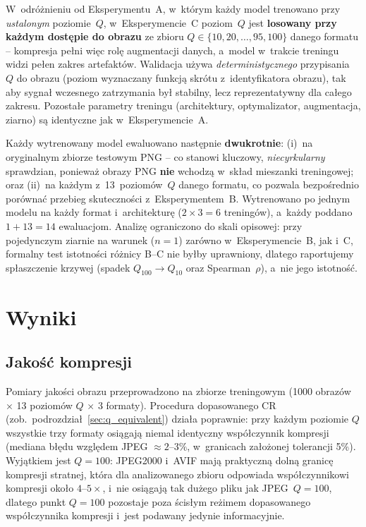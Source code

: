 \documentclass[12pt,a4paper]{article}
\begin{document}
W~odróżnieniu od Eksperymentu~A, w~którym każdy model trenowano przy \emph{ustalonym} poziomie~$Q$, w~Eksperymencie~C poziom~$Q$ jest \textbf{losowany przy każdym dostępie do obrazu} ze zbioru $Q \in \{10, 20, \dots, 95, 100\}$ danego formatu -- kompresja pełni więc rolę augmentacji danych, a~model w~trakcie treningu widzi pełen zakres artefaktów. Walidacja używa \emph{deterministycznego} przypisania~$Q$ do obrazu (poziom wyznaczany funkcją skrótu z~identyfikatora obrazu), tak aby sygnał wczesnego zatrzymania był stabilny, lecz reprezentatywny dla całego zakresu. Pozostałe parametry treningu (architektury, optymalizator, augmentacja, ziarno) są identyczne jak w~Eksperymencie~A.

Każdy wytrenowany model ewaluowano następnie \textbf{dwukrotnie}: (i)~na oryginalnym zbiorze testowym PNG -- co stanowi kluczowy, \emph{niecyrkularny} sprawdzian, ponieważ obrazy PNG \textbf{nie} wchodzą w~skład mieszanki treningowej; oraz (ii)~na każdym z~13~poziomów~$Q$ danego formatu, co pozwala bezpośrednio porównać przebieg skuteczności z~Eksperymentem~B. Wytrenowano po jednym modelu na każdy format i~architekturę ($2 \times 3 = 6$ treningów), a~każdy poddano $1 + 13 = 14$ ewaluacjom. Analizę ograniczono do skali opisowej: przy pojedynczym ziarnie na warunek ($n=1$) zarówno w~Eksperymencie~B, jak i~C, formalny test istotności różnicy B--C nie byłby uprawniony, dlatego raportujemy spłaszczenie krzywej (spadek $Q_{100}\!\to\!Q_{10}$ oraz Spearman~$\rho$), a~nie jego istotność.


\clearpage
\section{Wyniki}
\label{sec:wyniki}

\subsection{Jakość kompresji}

Pomiary jakości obrazu przeprowadzono na zbiorze treningowym (1000 obrazów $\times$ 13 poziomów $Q$ $\times$ 3 formaty). Procedura dopasowanego CR (zob.~podrozdział~\ref{sec:q_equivalent}) działa poprawnie: przy każdym poziomie $Q$ wszystkie trzy formaty osiągają niemal identyczny współczynnik kompresji (mediana błędu względem JPEG $\approx 2$--$3\%$, w~granicach założonej tolerancji 5\%). Wyjątkiem jest $Q=100$: JPEG2000 i~AVIF mają praktyczną dolną granicę kompresji stratnej, która dla analizowanego zbioru odpowiada współczynnikowi kompresji około $4$--$5\times$, i~nie osiągają tak dużego pliku jak JPEG~$Q=100$, dlatego punkt $Q=100$ pozostaje poza ścisłym reżimem dopasowanego współczynnika kompresji i~jest podawany jedynie informacyjnie.
\end{document}
